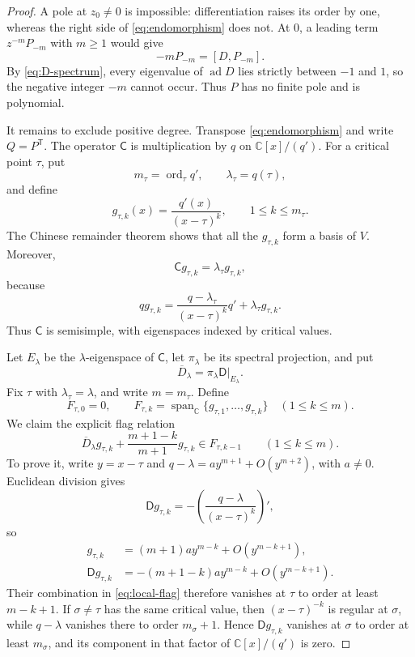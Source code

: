 \documentclass[11pt]{article}
\numberwithin{equation}{section}
\theoremstyle{definition}
\theoremstyle{remark}
\newcommand{\C}{\mathbb C}
\newcommand{\Span}{\operatorname{span}}
\newcommand{\ord}{\operatorname{ord}}
\begin{document}
\begin{proof}
A pole at $z_0\ne0$ is impossible: differentiation raises its order by
one, whereas the right side of \eqref{eq:endomorphism} does not.  At $0$,
a leading term $z^{-m}P_{-m}$ with $m\ge1$ would give
\[
  -mP_{-m}=[D,P_{-m}].
\]
By \eqref{eq:D-spectrum}, every eigenvalue of
$\operatorname{ad}D$ lies strictly between $-1$ and $1$, so the negative
integer $-m$ cannot occur.  Thus $P$ has no finite pole and is polynomial.

It remains to exclude positive degree.  Transpose
\eqref{eq:endomorphism} and write $Q=P^{\mathsf T}$.  The operator
$\mathsf C$ is multiplication by $q$ on $\C[x]/(q')$.  For a critical
point $\tau$, put
\[
  m_\tau=\ord_\tau q',
  \qquad \lambda_\tau=q(\tau),
\]
and define
\[
  g_{\tau,k}(x)=\frac{q'(x)}{(x-\tau)^k},
  \qquad 1\le k\le m_\tau.
\]
The Chinese remainder theorem shows that all the $g_{\tau,k}$ form a
basis of $V$.  Moreover,
\[
  \mathsf Cg_{\tau,k}=\lambda_\tau g_{\tau,k},
\]
because
\[
  qg_{\tau,k}
  =\frac{q-\lambda_\tau}{(x-\tau)^k}q'
   +\lambda_\tau g_{\tau,k}.
\]
Thus $\mathsf C$ is semisimple, with eigenspaces indexed by critical
values.

Let $E_\lambda$ be the $\lambda$-eigenspace of $\mathsf C$, let
$\pi_\lambda$ be its spectral projection, and put
\[
  \overline D_\lambda
  =\pi_\lambda\mathsf D|_{E_\lambda}.
\]
Fix $\tau$ with $\lambda_\tau=\lambda$, and write $m=m_\tau$.
Define
\[
  F_{\tau,0}=0,\qquad
  F_{\tau,k}=\Span_\C\{g_{\tau,1},\ldots,g_{\tau,k}\}
  \quad(1\le k\le m).
\]
We claim the explicit flag relation
\begin{equation}\label{eq:local-flag}
  \overline D_\lambda g_{\tau,k}
  +\frac{m+1-k}{m+1}g_{\tau,k}
  \in F_{\tau,k-1}
  \qquad(1\le k\le m).
\end{equation}
To prove it, write $y=x-\tau$ and
$q-\lambda=ay^{m+1}+O(y^{m+2})$, with $a\ne0$.  Euclidean division gives
\[
  \mathsf Dg_{\tau,k}
  =-\left(\frac{q-\lambda}{(x-\tau)^k}\right)',
\]
so
\begin{align*}
  g_{\tau,k}&=(m+1)a y^{m-k}+O(y^{m-k+1}),\\
  \mathsf Dg_{\tau,k}&=-(m+1-k)a y^{m-k}+O(y^{m-k+1}).
\end{align*}
Their combination in \eqref{eq:local-flag} therefore vanishes at $\tau$
to order at least $m-k+1$.  If $\sigma\ne\tau$ has the same critical
value, then $(x-\tau)^{-k}$ is regular at $\sigma$, while $q-\lambda$
vanishes there to order $m_\sigma+1$.  Hence
$\mathsf Dg_{\tau,k}$ vanishes at $\sigma$ to order at least $m_\sigma$,
and its component in that factor of $\C[x]/(q')$ is zero.


\end{proof}
\end{document}
